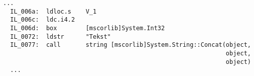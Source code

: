 \begin{lstlisting}[language=IL, caption={Fragment kodu deasemblerowanego testu programu C\#, przedstawiający łączenie łańcuchów znaków}, label=alg:asm]
  ...
  IL_006a:  ldloc.s    V_1
  IL_006c:  ldc.i4.2
  IL_006d:  box        [mscorlib]System.Int32
  IL_0072:  ldstr      "Tekst"
  IL_0077:  call       string [mscorlib]System.String::Concat(object,
                                                              object,
                                                              object)
  ...
\end{lstlisting}







